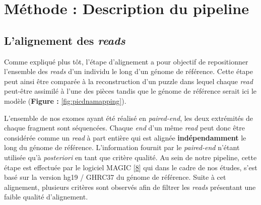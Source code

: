 \documentclass[12pt,twoside]{ugathesis}
\begin{document}
\newpage

\section{Méthode : Description du
pipeline}\label{methode-description-du-pipeline}

\subsection{\texorpdfstring{L'alignement des
\emph{reads}}{L'alignement des reads}}\label{lalignement-des-reads}

Comme expliqué plus tôt, l'étape d'alignement a pour objectif de
repositionner l'ensemble des \emph{reads} d'un individu le long d'un
génome de référence. Cette étape peut ainsi être comparée à la
reconstruction d'un puzzle dans lequel chaque \emph{read} peut-être
assimilé à l'une des pièces tandis que le génome de référence serait ici
le modèle (\textbf{Figure : }\ref{fig:picdnamapping}).

L'ensemble de nos exomes ayant été réalisé en \emph{paired-end}, les
deux extrémités de chaque fragment sont séquencées. Chaque \emph{end}
d'un même \emph{read} peut donc être considérée comme un \emph{read} à
part entière qui est alignée \textbf{indépendamment} le long du génome
de référence. L'information fournit par le \emph{paired-end} n'étant
utilisée qu'à \emph{posteriori} en tant que critère qualité. Au sein de
notre pipeline, cette étape est effectuée par le logiciel MAGIC
{[}\protect\hyperlink{ref-Su2014}{8}{]} qui dans le cadre de nos études,
s'est basé sur la version hg19 / GHRC37 du génome de référence. Suite à
cet alignement, plusieurs critères sont observés afin de filtrer les
\emph{reads} présentant une faible qualité d'alignement.
\end{document}
